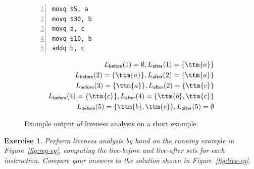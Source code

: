 \documentclass[7x10,nocrop]{TimesAPriori_MIT}%
\newtheorem{exercise}[theorem]{Exercise}
\begin{document}
\begin{figure}[tbp]
\begin{minipage}{0.45\textwidth}
\begin{lstlisting}[numbers=left,numberstyle=\tiny]
movq $5, a
movq $30, b
movq a, c
movq $10, b
addq b, c
\end{lstlisting}
\end{minipage}
\vrule\hspace{10pt}
\begin{minipage}{0.45\textwidth}
\begin{align*}
L_{\mathsf{before}}(1)=  \emptyset, 
L_{\mathsf{after}}(1)=  \{\ttm{a}\}\\
L_{\mathsf{before}}(2)=  \{\ttm{a}\},
L_{\mathsf{after}}(2)=  \{\ttm{a}\}\\
L_{\mathsf{before}}(3)=  \{\ttm{a}\},
L_{\mathsf{after}}(2)=  \{\ttm{c}\}\\
L_{\mathsf{before}}(4)=  \{\ttm{c}\},
L_{\mathsf{after}}(4)=  \{\ttm{b},\ttm{c}\}\\
L_{\mathsf{before}}(5)=  \{\ttm{b},\ttm{c}\},
L_{\mathsf{after}}(5)=  \emptyset
\end{align*}
\end{minipage}
\caption{Example output of liveness analysis on a short example.}
\label{fig:liveness-example-0}
\end{figure}

\begin{exercise}\normalfont\normalsize
  Perform liveness analysis by hand on the running example in
  Figure~\ref{fig:reg-eg}, computing the live-before and live-after
  sets for each instruction. Compare your answers to the solution
  shown in Figure~\ref{fig:live-eg}.
\end{exercise}
\end{document}
